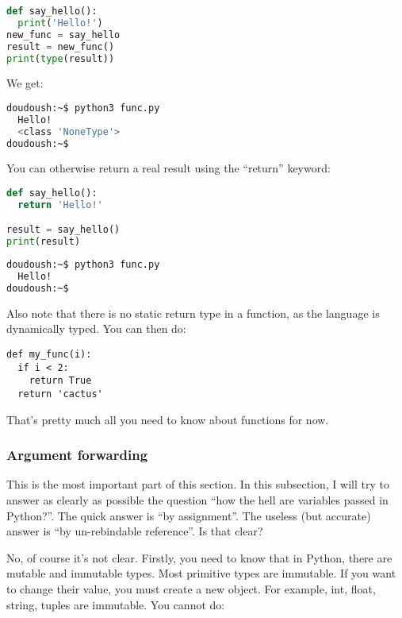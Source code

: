 \begin{lstlisting}[language=python]
def say_hello():
  print('Hello!')
new_func = say_hello
result = new_func()
print(type(result))
\end{lstlisting}

We get:
\begin{lstlisting}[language=bash]
doudoush:~$ python3 func.py
  Hello!
  <class 'NoneType'>
doudoush:~$
\end{lstlisting}

You can otherwise return a real result using the ``return'' keyword:

\begin{lstlisting}[language=python]
def say_hello():
  return 'Hello!'

result = say_hello()
print(result)
\end{lstlisting}

\begin{lstlisting}[language=bash]
doudoush:~$ python3 func.py
  Hello!
doudoush:~$
\end{lstlisting}

Also note that there is no static return type in a function, as the language is dynamically typed. You can
then do:

\begin{lstlisting}
def my_func(i):
  if i < 2:
    return True
  return 'cactus'
\end{lstlisting}

That's pretty much all you need to know about functions for now.

\subsubsection{Argument forwarding}

This is the most important part of this section. In this subsection, I will
try to answer as clearly as possible the question ``how the hell are variables
passed in Python?''. The quick answer is ``by assignment''. The useless (but accurate)
answer is ``by un-rebindable reference''. Is that clear?

\vspace{5mm}

No, of course it's not clear. Firstly, you need to know that in
Python, there are mutable and immutable types. Most primitive types
are immutable. If you want to change their value, you must create a
new object. For example, int, float, string, tuples are immutable. You
cannot do:

